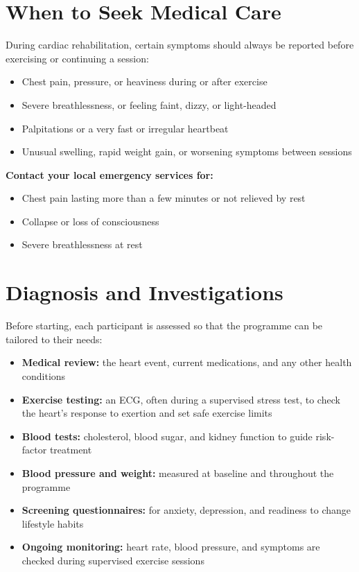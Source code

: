 \section*{When to Seek Medical Care}
During cardiac rehabilitation, certain symptoms should always be reported before exercising or continuing a session:
\begin{itemize}
    \item Chest pain, pressure, or heaviness during or after exercise
    \item Severe breathlessness, or feeling faint, dizzy, or light-headed
    \item Palpitations or a very fast or irregular heartbeat
    \item Unusual swelling, rapid weight gain, or worsening symptoms between sessions
\end{itemize}
\textbf{Contact your local emergency services for:}
\begin{itemize}
    \item Chest pain lasting more than a few minutes or not relieved by rest
    \item Collapse or loss of consciousness
    \item Severe breathlessness at rest
\end{itemize}

\section*{Diagnosis and Investigations}
Before starting, each participant is assessed so that the programme can be tailored to their needs:
\begin{itemize}
    \item \textbf{Medical review:} the heart event, current medications, and any other health conditions
    \item \textbf{Exercise testing:} an ECG, often during a supervised stress test, to check the heart's response to exertion and set safe exercise limits
    \item \textbf{Blood tests:} cholesterol, blood sugar, and kidney function to guide risk-factor treatment
    \item \textbf{Blood pressure and weight:} measured at baseline and throughout the programme
    \item \textbf{Screening questionnaires:} for anxiety, depression, and readiness to change lifestyle habits
    \item \textbf{Ongoing monitoring:} heart rate, blood pressure, and symptoms are checked during supervised exercise sessions
\end{itemize}

